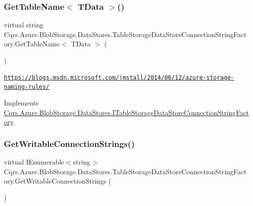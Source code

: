 \subsubsection{\texorpdfstring{Get\+Table\+Name$<$ T\+Data $>$()}{GetTableName< TData >()}}
{\footnotesize\ttfamily virtual string Cqrs.\+Azure.\+Blob\+Storage.\+Data\+Stores.\+Table\+Storage\+Data\+Store\+Connection\+String\+Factory.\+Get\+Table\+Name$<$ T\+Data $>$ (\begin{DoxyParamCaption}{ }\end{DoxyParamCaption})\hspace{0.3cm}{\ttfamily [virtual]}}

\href{https://blogs.msdn.microsoft.com/jmstall/2014/06/12/azure-storage-naming-rules/}{\tt https\+://blogs.\+msdn.\+microsoft.\+com/jmstall/2014/06/12/azure-\/storage-\/naming-\/rules/}

Implements \hyperlink{interfaceCqrs_1_1Azure_1_1BlobStorage_1_1DataStores_1_1ITableStorageDataStoreConnectionStringFactory_a40ff0417d18d0cf9d0f59d6dfddfaa15_a40ff0417d18d0cf9d0f59d6dfddfaa15}{Cqrs.\+Azure.\+Blob\+Storage.\+Data\+Stores.\+I\+Table\+Storage\+Data\+Store\+Connection\+String\+Factory}.

\mbox{\label{classCqrs_1_1Azure_1_1BlobStorage_1_1DataStores_1_1TableStorageDataStoreConnectionStringFactory_a65b6f404ac2434c6366af73a22e914d1_a65b6f404ac2434c6366af73a22e914d1}} 
\subsubsection{\texorpdfstring{Get\+Writable\+Connection\+Strings()}{GetWritableConnectionStrings()}}
{\footnotesize\ttfamily virtual I\+Enumerable$<$string$>$ Cqrs.\+Azure.\+Blob\+Storage.\+Data\+Stores.\+Table\+Storage\+Data\+Store\+Connection\+String\+Factory.\+Get\+Writable\+Connection\+Strings (\begin{DoxyParamCaption}{ }\end{DoxyParamCaption})\hspace{0.3cm}{\ttfamily [virtual]}}



